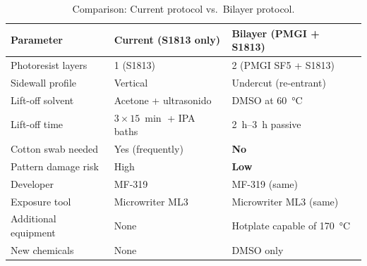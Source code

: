 \documentclass[11pt,a4paper]{article}
\begin{document}
\begin{table}[H]
\centering
\caption{Comparison: Current protocol vs.\ Bilayer protocol.}
\begin{tabular}{@{}p{4cm}p{4.5cm}p{4.5cm}@{}}
\toprule
\textbf{Parameter} & \textbf{Current (S1813 only)} & \textbf{Bilayer
    (PMGI + S1813)} \\
\midrule
Photoresist layers & 1 (S1813) & 2 (PMGI SF5 + S1813) \\
Sidewall profile & Vertical & Undercut (re-entrant) \\
Lift-off solvent & Acetone + ultrasonido & DMSO at \SI{60}{\celsius} \\
Lift-off time & $3 \times \SI{15}{\min}$ + IPA baths &
    \SIrange{2}{3}{\hour} passive \\
Cotton swab needed & Yes (frequently) & \textbf{No} \\
Pattern damage risk & High & \textbf{Low} \\
Developer & MF-319 & MF-319 (same) \\
Exposure tool & Microwriter ML3 & Microwriter ML3 (same) \\
Additional equipment & None & Hotplate capable of \SI{170}{\celsius} \\
New chemicals & None & DMSO only \\
\bottomrule
\end{tabular}
\end{table}



\nocite{*}

\end{document}
